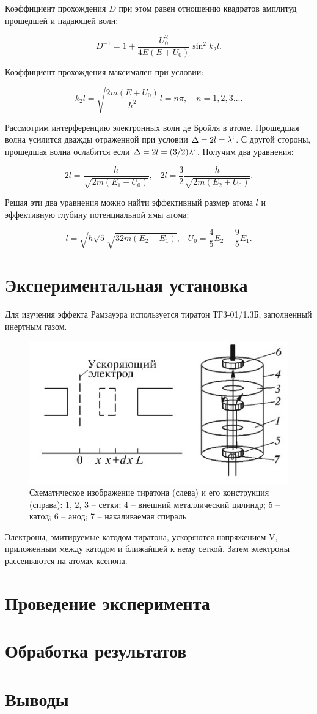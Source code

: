 \documentclass[14pt, a4paper]{report}
\begin{document}
Коэффициент прохождения $D$ при этом равен отношению квадратов амплитуд прошедшей и падающей волн:

\[D^{-1}=1+\frac{U_0^2}{4E(E+U_0)}\sin^2{k_2l}\text{.}\]

Коэффициент прохождения максимален при условии:

\[k_2l=\sqrt{\frac{2m(E + U_0)}{\hbar^2}}l=n\pi,\quad n=1,2,3...\text{.}\]

Рассмотрим интерференцию электронных волн де Бройля в атоме. Прошедшая волна усилится дважды отраженной при условии $\Delta=2l=\lambda`$. С другой стороны, прошедшая волна ослабится если $\Delta=2l=(3/2)\lambda`$. Получим два уравнения:

\[2l=\frac{h}{\sqrt{2m(E_1+U_0)}}\text{,}\quad 2l=\frac{3}{2}\frac{h}{\sqrt{2m(E_2+U_0)}}\text{.}\]

Решая эти два уравнения можно найти эффективный размер атома $l$ и эффективную глубину потенциальной ямы атома:

\[l=\sqrt{h\sqrt{5}}{\sqrt{32m(E_2-E_1)}}\text{,}\quad U_0=\frac{4}{5}E_2-\frac{9}{5}E_1\text{.}\]

\section{Экспериментальная установка}

Для изучения эффекта Рамзауэра используется тиратон ТГ3-01/1.3Б, заполненный инертным газом.

\begin{figure}[H]
\centering
\includegraphics[scale=0.8]{../images/513-3}
\caption{Схематическое изображение тиратона (слева) и его конструкция (справа): 1, 2, 3 -- сетки; 4 -- внешний металлический цилиндр; 5 -- катод; 6 -- анод; 7 -- накаливаемая спираль}
\end{figure}

Электроны, эмитируемые катодом тиратона, ускоряются напряжением V, приложенным между катодом и ближайшей к нему сеткой. Затем электроны рассеиваются на атомах ксенона.

\section{Проведение эксперимента}

\section{Обработка результатов}

\section{Выводы}
\end{document}
